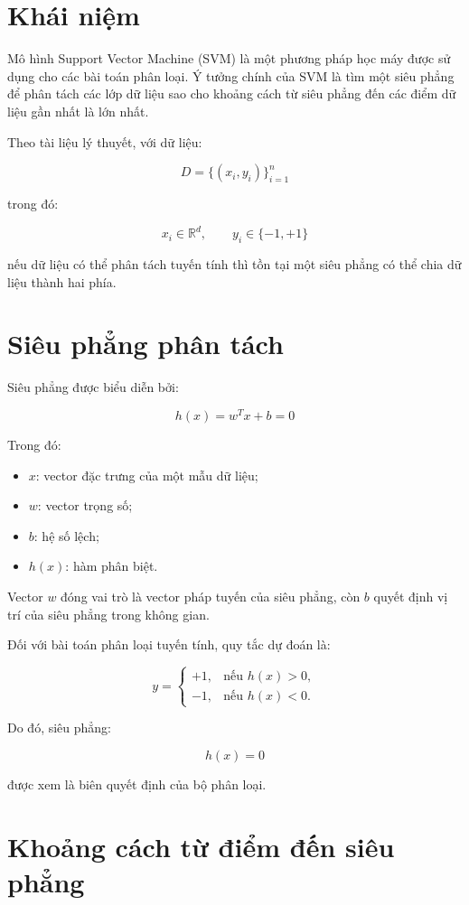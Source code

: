 \documentclass[12pt,a4paper]{report}
\begin{document}
	\section{Khái niệm}
	
	Mô hình Support Vector Machine (SVM) là một phương pháp học máy được sử dụng cho các bài toán phân loại. Ý tưởng chính của SVM là tìm một siêu phẳng để phân tách các lớp dữ liệu sao cho khoảng cách từ siêu phẳng đến các điểm dữ liệu gần nhất là lớn nhất.
	
\noindent
	Theo tài liệu lý thuyết, với dữ liệu:

	$$
	D = \{(x_i,y_i)\}_{i=1}^{n}
	$$

\noindent
	trong đó:

	$$
	x_i \in \mathbb{R}^{d}, \qquad y_i \in \{-1,+1\}
	$$

	nếu dữ liệu có thể phân tách tuyến tính thì tồn tại một siêu phẳng có thể chia dữ liệu thành hai phía.

	\section{Siêu phẳng phân tách}

	Siêu phẳng được biểu diễn bởi:

	$$
	h(x)=w^Tx+b=0
	$$

\noindent
Trong đó:

\begin{itemize}
	\item $x$: vector đặc trưng của một mẫu dữ liệu;
	\item $w$: vector trọng số;
	\item $b$: hệ số lệch;
	\item $h(x)$: hàm phân biệt.
\end{itemize}

Vector $w$ đóng vai trò là vector pháp tuyến của siêu phẳng, còn $b$
quyết định vị trí của siêu phẳng trong không gian.

\noindent
Đối với bài toán phân loại tuyến tính, quy tắc dự đoán là:

$$
y=
\begin{cases}
	+1, & \text{nếu } h(x)>0,\\
	-1, & \text{nếu } h(x)<0.
\end{cases}
$$

Do đó, siêu phẳng:

$$
h(x)=0
$$

được xem là biên quyết định của bộ phân loại.

\section{Khoảng cách từ điểm đến siêu phẳng}
\end{document}
